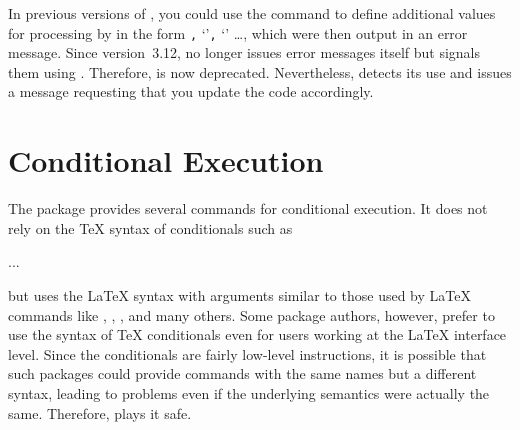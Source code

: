 %
\EndIndexGroup


\begin{Declaration}
\end{Declaration}
In previous versions
of , you could use the  command to
define additional values for processing by
 in the form
  \texttt{,} `'\texttt{,} `' \dots,
which were then output in an error message. Since version~3.12,
 no longer issues error messages
itself but signals them using .
Therefore,  is now deprecated. Nevertheless,
 detects its use and issues a message requesting that you
update the code accordingly.%
\EndIndexGroup


\section{Conditional Execution}

The  package provides several commands for conditional
execution. It does not rely on the \TeX{} syntax of conditionals such as
\begin{lstcode}
  \iftrue
    ...
  \else
    ...
  \fi
\end{lstcode}
but uses the \LaTeX{} syntax with arguments similar to those used by \LaTeX{}
commands like , ,
, and many others. Some package authors, however,
prefer to use the syntax of \TeX{} conditionals even for users working at the
\LaTeX{} interface level. Since the  conditionals are fairly
low-level instructions, it is possible that such packages could provide
commands with the same names but a different syntax, leading to problems even
if the underlying semantics were actually the same. Therefore,
 plays it safe.

